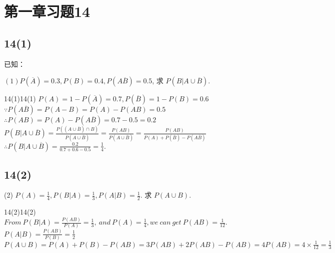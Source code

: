 \documentclass[twoside]{article}
\begin{document}
\maketitle
\vspace{-3.5em}

\tableofcontents

\section{第一章习题14}

\subsection{14(1)}

已知：

\( (1) P(\overline{A}) = 0.3, P(B) = 0.4, P(A\overline{B}) = 0.5 \), 求 \( P(B | A \cup \overline{B}) \).

\begin{ans}{14(1)}{14(1)}
    \( P(A) = 1 - P(\overline{A}) = 0.7, P(\overline{B}) = 1 - P(B) = 0.6 \)\\
    \( \because P(A\overline{B}) = P(A-B) = P(A) - P(AB) = 0.5 \) \\
    \( \therefore P(AB) = P(A) - P(A\overline{B}) = 0.7 - 0.5 = 0.2 \) \\
    \( P(B|A \cup \overline{B}) = \frac{P((A \cup \overline{B}) \cap B)}{P(A \cup \overline{B})} = \frac{P(AB)}{P(A \cup \overline{B})} = \frac{P(AB)}{P(A) + P(\overline{B}) - P(A\overline{B})} \) \\
    \( \therefore P(B|A \cup \overline{B}) = \frac{0.2}{0.7 + 0.6 - 0.5} = \frac{1}{4}. \)
\end{ans}

\subsection{14(2)}

(2) \( P(A) = \frac{1}{4}, P(B|A) = \frac{1}{3}, P(A|B) = \frac{1}{2}. \) 求 \( P(A \cup B) \).

\begin{ans}{14(2)}{14(2)}
    \( From \ P(B|A) = \frac{P(AB)}{P(A)} = \frac{1}{3}, \ and\  P(A) = \frac{1}{4},we\ can\ get\ P(AB) = \frac{1}{12}.\) \\
    \( P(A|B) = \frac{P(AB)}{P(B)} = \frac{1}{2}\) \\
    \( P(A \cup B) = P(A) + P(B) - P(AB) = 3P(AB) + 2P(AB) - P(AB) = 4P(AB) = 4 \times \frac{1}{12} = \frac{1}{3} \)
\end{ans}
\end{document}
